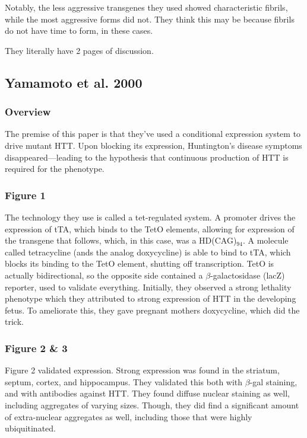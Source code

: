 Notably, the less aggressive transgenes they used showed characteristic fibrils, while the most aggressive forms did not. They think this may be because fibrils do not have time to form, in these cases.\newline


They literally have 2 pages of discussion.

\subsection*{Yamamoto et al. 2000}

\subsubsection*{Overview}

The premise of this paper is that they've used a conditional expression system to drive mutant HTT. Upon blocking its expression, Huntington's disease symptoms disappeared---leading to the hypothesis that continuous production of HTT is required for the phenotype. 

\subsubsection*{Figure 1}

The technology they use is called a tet-regulated system. A promoter drives the expression of tTA, which binds to the TetO elements, allowing for expression of the transgene that follows, which, in this case, was a HD(CAG)$_{94}$. A molecule called tetracycline (ands the analog doxycycline) is able to bind to tTA, which blocks its binding to the TetO element, shutting off transcription. TetO is actually bidirectional, so the opposite side contained a $\beta$-galactosidase (lacZ) reporter, used to validate everything. Initially, they observed a strong lethality phenotype which they attributed to strong expression of HTT in the developing fetus. To ameliorate this, they gave pregnant mothers doxycycline, which did the trick. 

\subsubsection*{Figure 2 \& 3}

Figure 2 validated expression. Strong expression was found in the striatum, septum, cortex, and hippocampus. They validated this both with $\beta$-gal staining, and with antibodies against HTT. They found diffuse nuclear staining as well, including aggregates of varying sizes. Though, they did find a significant amount of extra-nuclear aggregates as well, including those that were highly ubiquitinated.\newline

